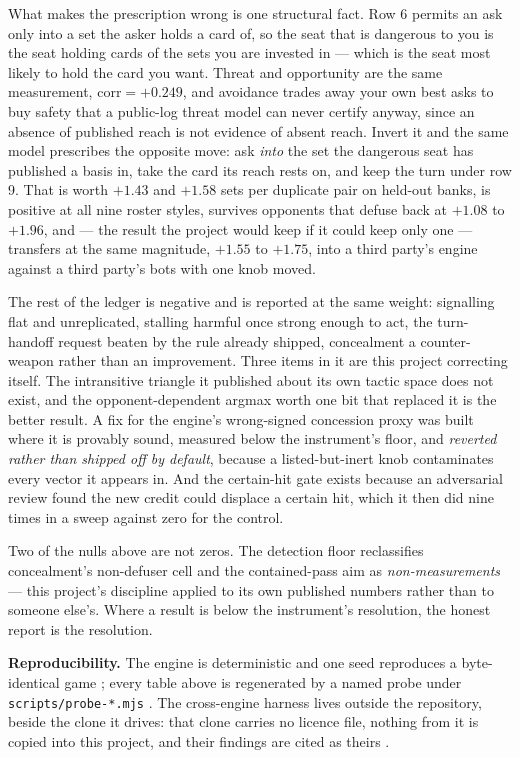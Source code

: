 \documentclass[11pt]{article}
\newcommand{\code}[1]{\texttt{#1}}
\begin{document}
What makes the prescription wrong is one structural fact. Row 6 permits an ask only into a set the
asker holds a card of, so the seat that is dangerous to you is the seat holding cards of the sets
you are invested in --- which is the seat most likely to hold the card you want. Threat and
opportunity are the same measurement, $\mathrm{corr} = +0.249$, and avoidance trades away your own
best asks to buy safety that a public-log threat model can never certify anyway, since an absence of
published reach is not evidence of absent reach. Invert it and the same model prescribes the
opposite move: ask \emph{into} the set the dangerous seat has published a basis in, take the card
its reach rests on, and keep the turn under row 9. That is worth $+1.43$ and $+1.58$ sets per
duplicate pair on held-out banks, is positive at all nine roster styles, survives opponents that
defuse back at $+1.08$ to $+1.96$, and --- the result the project would keep if it could keep only
one --- transfers at the same magnitude, $+1.55$ to $+1.75$, into a third party's engine against a
third party's bots with one knob moved.

The rest of the ledger is negative and is reported at the same weight: signalling flat and
unreplicated, stalling harmful once strong enough to act, the turn-handoff request beaten by the
rule already shipped, concealment a counter-weapon rather than an improvement. Three items in it are
this project correcting itself. The intransitive triangle it published about its own tactic space
does not exist, and the opponent-dependent argmax worth one bit that replaced it is the better
result. A fix for the engine's wrong-signed concession proxy was built where it is provably sound,
measured below the instrument's floor, and \emph{reverted rather than shipped off by default},
because a listed-but-inert knob contaminates every vector it appears in. And the certain-hit gate
exists because an adversarial review found the new credit could displace a certain hit, which it
then did nine times in a sweep against zero for the control.

Two of the nulls above are not zeros. The detection floor \cite{floorpaper} reclassifies
concealment's non-defuser cell and the contained-pass aim as \emph{non-measurements} --- this
project's discipline applied to its own published numbers rather than to someone else's. Where a
result is below the instrument's resolution, the honest report is the resolution.

\medskip
\noindent\textbf{Reproducibility.} The engine is deterministic and one seed reproduces a
byte-identical game \cite{repo}; every table above is regenerated by a named probe under
\code{scripts/probe-*.mjs} \cite{concession}. The cross-engine harness lives outside the repository,
beside the clone it drives: that clone carries no licence file, nothing from it is copied into this
project, and their findings are cited as theirs \cite{crossplay,fishlabs}.
\end{document}
